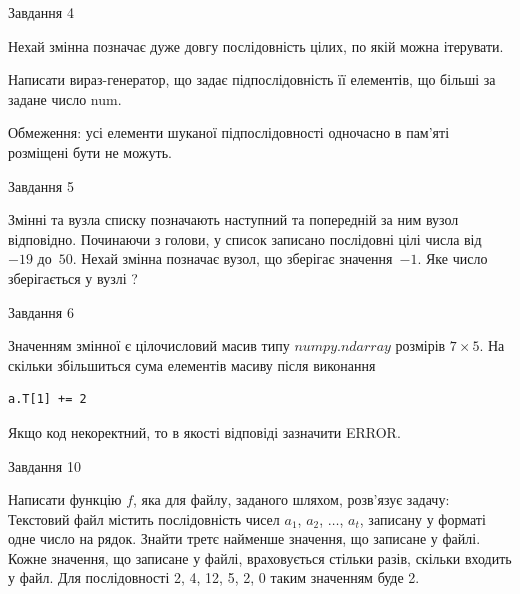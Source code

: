 \documentclass[12pt, ukrainian]{article}
\begin{document}
{\begin{minipage}[t]{8.0cm}
\begin{verbatim}
\end{verbatim}            

\end{minipage}


               
{\begin{center}Завдання {4}\end{center}}
\vspace{-4mm}
Нехай змінна  позначає дуже довгу послідовність цілих, по якій можна ітерувати.

Написати вираз-генератор, що задає підпослідовність її елементів, що більші за задане число num.

Обмеження: усі елементи шуканої підпослідовності одночасно в пам'яті розміщені бути не можуть.\par

\vspace{10mm}
               
{\begin{center}Завдання {5}\end{center}}
\vspace{-4mm}
Змінні  та  вузла списку позначають наступний та попередній за ним вузол відповідно. Починаючи з голови, у список записано послідовні цілі числа від~$-19$ до~$50$. Нехай змінна  позначає вузол, що зберігає значення~$-1$.
Яке число зберігається у вузлі  ?\par

               
{\begin{center}Завдання {6}\end{center}}
\vspace{-4mm}
Значенням змінної  є цілочисловий масив типу $numpy.ndarray$ розмірів $7{\times}5$. На скільки збільшиться сума елементів масиву  після виконання
\begin{verbatim}
a.T[1] += 2
\end{verbatim}


Якщо код некоректний, то в якості відповіді зазначити ERROR.\par

               
{\begin{center}Завдання {10}\end{center}}
\vspace{-4mm}

Написати функцію $f$, яка для файлу, заданого шляхом, розв’язує задачу:\\ Текстовий файл містить послідовність чисел $a_1$, $a_2$, $\ldots$, $a_t$, записану у форматі одне число на рядок. Знайти третє найменше значення, що записане у файлі. Кожне значення, що записане у файлі, враховується стільки разів, скільки входить у файл. Для послідовності 2, 4, 12, 5, 2, 0 таким значенням буде 2.

}
\end{document}
